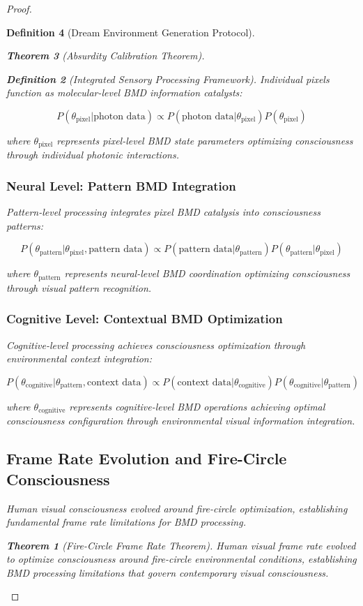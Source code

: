 \documentclass[12pt,a4paper]{article}
\newtheorem{theorem}{Theorem}[section]
\newtheorem{definition}[theorem]{Definition}
\begin{document}
\begin{proof}
\begin{definition}[Dream Environment Generation Protocol]
\begin{theorem}[Absurdity Calibration Theorem]
\begin{observation}
\begin{definition}[Integrated Sensory Processing Framework]
Individual pixels function as molecular-level BMD information catalysts:

$$P(\theta_{\text{pixel}} | \text{photon data}) \propto P(\text{photon data} | \theta_{\text{pixel}}) P(\theta_{\text{pixel}})$$

where $\theta_{\text{pixel}}$ represents pixel-level BMD state parameters optimizing consciousness through individual photonic interactions.

\subsubsection{Neural Level: Pattern BMD Integration}

Pattern-level processing integrates pixel BMD catalysis into consciousness patterns:

$$P(\theta_{\text{pattern}} | \theta_{\text{pixel}}, \text{pattern data}) \propto P(\text{pattern data} | \theta_{\text{pattern}}) P(\theta_{\text{pattern}} | \theta_{\text{pixel}})$$

where $\theta_{\text{pattern}}$ represents neural-level BMD coordination optimizing consciousness through visual pattern recognition.

\subsubsection{Cognitive Level: Contextual BMD Optimization}

Cognitive-level processing achieves consciousness optimization through environmental context integration:

$$P(\theta_{\text{cognitive}} | \theta_{\text{pattern}}, \text{context data}) \propto P(\text{context data} | \theta_{\text{cognitive}}) P(\theta_{\text{cognitive}} | \theta_{\text{pattern}})$$

where $\theta_{\text{cognitive}}$ represents cognitive-level BMD operations achieving optimal consciousness configuration through environmental visual information integration.

\subsection{Frame Rate Evolution and Fire-Circle Consciousness}

Human visual consciousness evolved around fire-circle optimization, establishing fundamental frame rate limitations for BMD processing.

\begin{theorem}[Fire-Circle Frame Rate Theorem]
Human visual frame rate evolved to optimize consciousness around fire-circle environmental conditions, establishing BMD processing limitations that govern contemporary visual consciousness.
\end{theorem}


\end{definition}
\end{observation}
\end{theorem}
\end{definition}
\end{proof}
\end{document}
